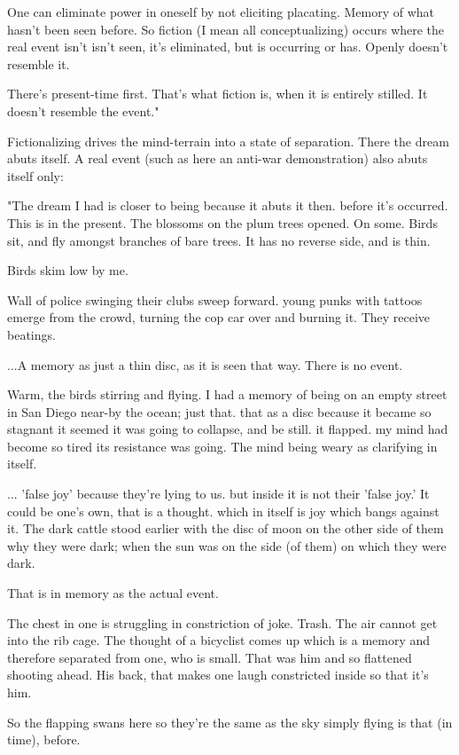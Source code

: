 One can eliminate power in oneself by not eliciting placating. Memory of
what hasn't been seen before. So fiction (I mean all conceptualizing)
occurs where the real event isn't isn't seen, it's eliminated, but is
occurring or has. Openly doesn't resemble it.

There's present-time first. That's what fiction is, when it is entirely
stilled. It doesn't resemble the event."

Fictionalizing drives the mind-terrain into a state of separation. There
the dream abuts itself. A real event (such as here an anti-war
demonstration) also abuts itself only:

"The dream I had is closer to being because it abuts it then. before
it's occurred. This is in the present. The blossoms on the plum trees
opened. On some. Birds sit, and fly amongst branches of bare trees. It
has no reverse side, and is thin.

Birds skim low by me.

Wall of police swinging their clubs sweep forward. young punks with
tattoos emerge from the crowd, turning the cop car over and burning it.
They receive beatings.

...A memory as just a thin disc, as it is seen that way. There is no
event.

Warm, the birds stirring and flying. I had a memory of being on an empty
street in San Diego near-by the ocean; just that. that as a disc because
it became so stagnant it seemed it was going to collapse, and be still.
it flapped. my mind had become so tired its resistance was going. The
mind being weary as clarifying in itself.

... 'false joy' because they're lying to us. but inside it is not their
'false joy.' It could be one's own, that is a thought. which in itself
is joy which bangs against it. The dark cattle stood earlier with the
disc of moon on the other side of them why they were dark; when the sun
was on the side (of them) on which they were dark.

That is in memory as the actual event.

The chest in one is struggling in constriction of joke. Trash. The air
cannot get into the rib cage. The thought of a bicyclist comes up which
is a memory and therefore separated from one, who is small. That was him
and so flattened shooting ahead. His back, that makes one laugh
constricted inside so that it's him.

So the flapping swans here so they're the same as the sky simply flying
is that (in time), before.

